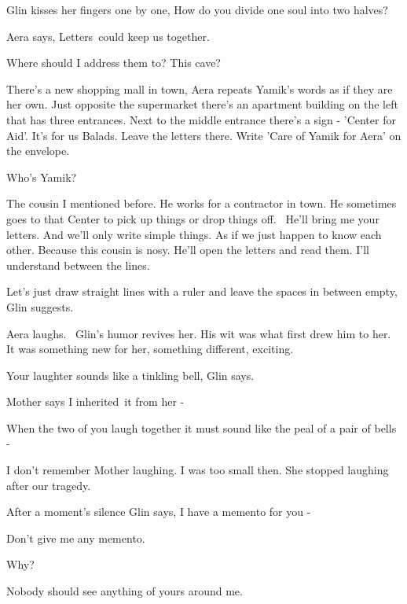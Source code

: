 \documentclass[twoside,11pt]{book}
\begin{document}
Glin kisses her fingers one by one, {\textquotedbl}How do you divide one soul into two halves?{\textquotedbl}

Aera says, {\textquotedbl}Letters~could keep us together.{\textquotedbl} 

{\textquotedbl}Where should I address them to? This cave?{\textquotedbl} 

{\textquotedbl}There's a new shopping mall in town,{\textquotedbl} Aera repeats Yamik's words as if they are her own.
{\textquotedbl}Just opposite the supermarket there's an apartment building on the left that has three entrances. Next
to the middle entrance there's a sign - 'Center for Aid'. It's for us Balads. Leave the letters there. Write 'Care of
Yamik for Aera' on the envelope.{\textquotedbl} 

{\textquotedbl}Who's Yamik?{\textquotedbl} 

{\textquotedbl}The cousin I mentioned before. He works for a contractor in town. He sometimes goes to that Center to
pick up things or drop things off.~ He'll bring me your letters. And we'll only write simple things. As if we just
happen to know each other. Because this cousin is nosy. He'll open the letters and read them. I'll understand between
the lines.{\textquotedbl}

{\textquotedbl}Let's just draw straight lines with a ruler and leave the spaces in between empty,{\textquotedbl} Glin
suggests. 

Aera laughs. ~Glin's humor revives her. His wit was what first drew him to her. It was something new for her, something
different, exciting.

{\textquotedbl}Your laughter sounds like a tinkling bell,{\textquotedbl} Glin says.

{\textquotedbl}Mother says I inherited\ it from her -{\textquotedbl} 

{\textquotedbl}When the two of you laugh together it must sound like the peal of a pair of bells -{\textquotedbl} 

{\textquotedbl}I don't remember Mother laughing. I was too small then. She stopped laughing after our
tragedy.{\textquotedbl}

After a moment's silence Glin says, {\textquotedbl}I have a memento for you -{\textquotedbl} 

{\textquotedbl}Don't give me any memento.{\textquotedbl} 

{\textquotedbl}Why?{\textquotedbl} 

{\textquotedbl}Nobody should see anything of yours around me.{\textquotedbl} 
\end{document}
